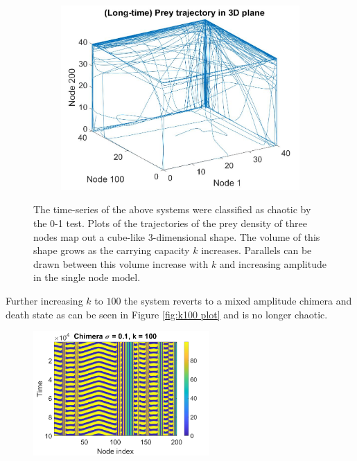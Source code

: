 \documentclass[12pt]{article}
\begin{document}
\begin{figure}[h]
\begin{subfigure}[b]{0.32\linewidth}
        \label{fig: k30lattice}
    \end{subfigure}
    \hfill
    \begin{subfigure}[b]{0.32\linewidth}
        \centering
        \includegraphics[width=\textwidth]{Chaos Stuff/k40traj.jpg}
        \label{fig:4 node lattice heatmap}
    \end{subfigure}
    \label{fig:k40lattice}
    \caption{The time-series of the above systems were classified as chaotic by the 0-1 test. Plots of the trajectories of the prey density of three nodes map out a cube-like 3-dimensional shape. The volume of this shape grows as the carrying capacity $k$ increases. Parallels can be drawn between this volume increase with $k$ and increasing amplitude in the single node model.}
\end{figure}
\noindent
Further increasing $k$ to $100$ the system reverts to a mixed amplitude chimera and death state as can be seen in Figure \ref{fig:k100 plot} and is no longer chaotic.

\begin{figure}[h]
    \centering
    \includegraphics[width = 0.6\textwidth]{Chaos Stuff/plot4.png}
\end{figure}\label{fig:k100 plot}
\end{document}

